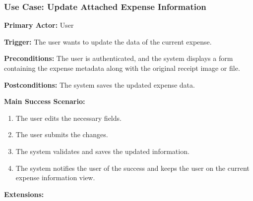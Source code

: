 \subsubsection{\textbf{Use Case: Update Attached Expense Information}}

\textbf{Primary Actor:} User

\textbf{Trigger:} The user wants to update the data of the current expense.

\textbf{Preconditions:} The user is authenticated, and the system displays a form containing the expense metadata along with the original receipt image or file.

\textbf{Postconditions:} The system saves the updated expense data.

\vspace{0.5cm}

\textbf{Main Success Scenario:}

\begin{enumerate} [leftmargin=0.75cm, noitemsep]
\item The user edits the necessary fields.
\item The user submits the changes.
\item The system validates and saves the updated information.
\item The system notifies the user of the success and keeps the user on the current expense information view.
\end{enumerate}

\vspace{0.3cm}

\textbf{Extensions:}

